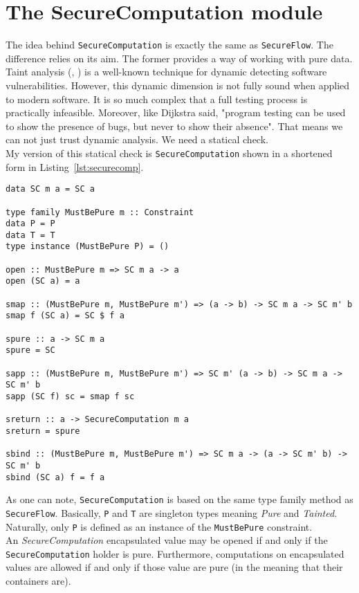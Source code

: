 \section{The SecureComputation module}\label{sec:computation}
The idea behind \texttt{SecureComputation} is exactly the same as \texttt{SecureFlow}. The difference relies on its aim. The former provides a way of working with pure data. Taint analysis (\cite{schwartz2010all}, \cite{newsome2005dynamic}) is a well-known technique for dynamic detecting software vulnerabilities. However, this dynamic dimension is not fully sound when applied to modern software. It is so much complex that a full testing process is practically infeasible. Moreover, like Dijkstra said, "program testing can be used to show the presence of bugs, but never to show their absence". That means we can not just trust dynamic analysis. We need a statical check. \\
My version of this statical check is \texttt{SecureComputation} shown in a shortened form in Listing~\ref{lst:securecomp}.
\begin{lstlisting}[caption={SecureComputation module}, label={lst:securecomp}, breaklines=true]
data SC m a = SC a

type family MustBePure m :: Constraint
data P = P
data T = T
type instance (MustBePure P) = ()

open :: MustBePure m => SC m a -> a
open (SC a) = a

smap :: (MustBePure m, MustBePure m') => (a -> b) -> SC m a -> SC m' b
smap f (SC a) = SC $ f a

spure :: a -> SC m a
spure = SC

sapp :: (MustBePure m, MustBePure m') => SC m' (a -> b) -> SC m a -> SC m' b
sapp (SC f) sc = smap f sc

sreturn :: a -> SecureComputation m a
sreturn = spure

sbind :: (MustBePure m, MustBePure m') => SC m a -> (a -> SC m' b) -> SC m' b
sbind (SC a) f = f a
\end{lstlisting}
As one can note, \texttt{SecureComputation} is based on the same type family method as \texttt{SecureFlow}. Basically, \texttt{P} and \texttt{T} are singleton types meaning \textit{Pure} and \textit{Tainted}. Naturally, only \texttt{P} is defined as an instance of the \texttt{MustBePure} constraint. \\
An \textit{SecureComputation} encapsulated value may be opened if and only if the \texttt{SecureComputation} holder is pure. Furthermore, computations on encapsulated values are allowed if and only if those value are pure (in the meaning that their containers are). \\
